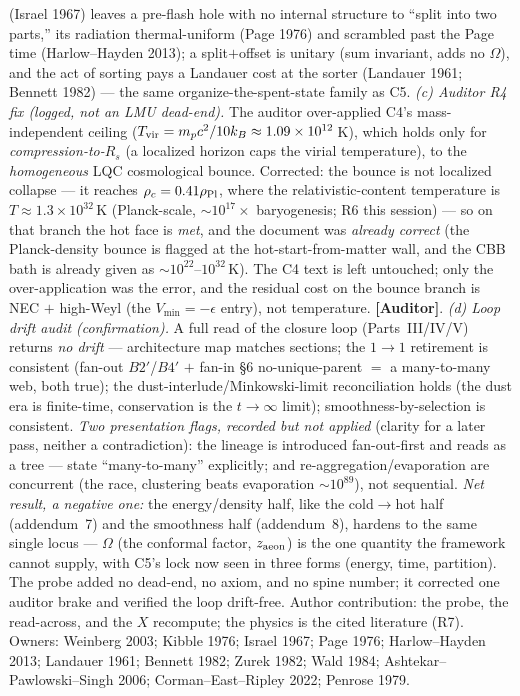 \documentclass[11pt]{article}
\newcommand{\Auditor}{\textbf{\textcolor{teal!55!black}{[Auditor]}}}
\begin{document}
(Israel 1967) leaves a pre-flash hole with no internal structure to ``split into two parts,'' its radiation thermal-uniform (Page 1976) and scrambled past the Page time (Harlow--Hayden 2013); a split$+$offset is unitary (sum invariant, adds no $\Omega$), and the act of sorting pays a Landauer cost at the sorter (Landauer 1961; Bennett 1982) --- the same organize-the-spent-state family as C5. \emph{(c) Auditor R4 fix (logged, not an LMU dead-end).} The auditor over-applied C4's mass-independent ceiling ($T_{\rm vir}=m_pc^2/10k_B\approx1.09\times10^{12}$\,K), which holds only for \emph{compression-to-$R_s$} (a localized horizon caps the virial temperature), to the \emph{homogeneous} LQC cosmological bounce. Corrected: the bounce is not localized collapse --- it reaches $\rho_c=0.41\rho_{\rm Pl}$, where the relativistic-content temperature is $T\approx1.3\times10^{32}$\,K (Planck-scale, $\sim10^{17}\times$ baryogenesis; R6 this session) --- so on that branch the hot face is \emph{met}, and the document was \emph{already correct} (the Planck-density bounce is flagged at the hot-start-from-matter wall, and the CBB bath is already given as $\sim10^{22}$--$10^{32}$\,K). The C4 text is left untouched; only the over-application was the error, and the residual cost on the bounce branch is NEC $+$ high-Weyl (the $V_{\min}=-\epsilon$ entry), not temperature. \Auditor. \emph{(d) Loop drift audit (confirmation).} A full read of the closure loop (Parts~III/IV/V) returns \emph{no drift} --- architecture map matches sections; the $1\to1$ retirement is consistent (fan-out $B2'$/$B4'$ $+$ fan-in \S6 no-unique-parent $=$ a many-to-many web, both true); the dust-interlude/Minkowski-limit reconciliation holds (the dust era is finite-time, conservation is the $t\to\infty$ limit); smoothness-by-selection is consistent. \emph{Two presentation flags, recorded but not applied} (clarity for a later pass, neither a contradiction): the lineage is introduced fan-out-first and reads as a tree --- state ``many-to-many'' explicitly; and re-aggregation/evaporation are concurrent (the race, clustering beats evaporation $\sim10^{89}$), not sequential. \emph{Net result, a negative one:} the energy/density half, like the cold$\to$hot half (addendum~7) and the smoothness half (addendum~8), hardens to the same single locus --- $\Omega$ (the conformal factor, $z_{\rm aeon}$) is the one quantity the framework cannot supply, with C5's lock now seen in three forms (energy, time, partition). The probe added no dead-end, no axiom, and no spine number; it corrected one auditor brake and verified the loop drift-free. Author contribution: the probe, the read-across, and the $X$ recompute; the physics is the cited literature (R7). Owners: Weinberg 2003; Kibble 1976; Israel 1967; Page 1976; Harlow--Hayden 2013; Landauer 1961; Bennett 1982; Zurek 1982; Wald 1984; Ashtekar--Pawlowski--Singh 2006; Corman--East--Ripley 2022; Penrose 1979.
\end{document}
